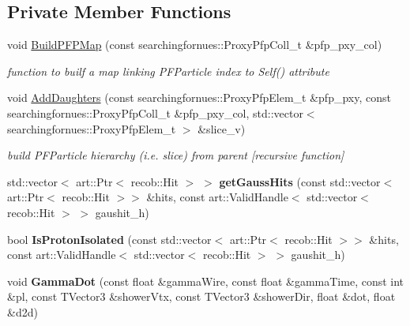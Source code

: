 \subsection*{Private Member Functions}
\begin{DoxyCompactItemize}
\item 
void \hyperlink{classSecondShowerPurity_a740e87a9a228f255bca15d2f04505aa9}{Build\+P\+F\+P\+Map} (const searchingfornues\+::\+Proxy\+Pfp\+Coll\+\_\+t \&pfp\+\_\+pxy\+\_\+col)
\begin{DoxyCompactList}\small\item\em function to builf a map linking P\+F\+Particle index to Self() attribute \end{DoxyCompactList}\item 
void \hyperlink{classSecondShowerPurity_a91a362195490bc158713e4ed84ed0fa2}{Add\+Daughters} (const searchingfornues\+::\+Proxy\+Pfp\+Elem\+\_\+t \&pfp\+\_\+pxy, const searchingfornues\+::\+Proxy\+Pfp\+Coll\+\_\+t \&pfp\+\_\+pxy\+\_\+col, std\+::vector$<$ searchingfornues\+::\+Proxy\+Pfp\+Elem\+\_\+t $>$ \&slice\+\_\+v)
\begin{DoxyCompactList}\small\item\em build P\+F\+Particle hierarchy (i.\+e. slice) from parent \mbox{[}recursive function\mbox{]} \end{DoxyCompactList}\item 
std\+::vector$<$ art\+::\+Ptr$<$ recob\+::\+Hit $>$ $>$ {\bfseries get\+Gauss\+Hits} (const std\+::vector$<$ art\+::\+Ptr$<$ recob\+::\+Hit $>$$>$ \&hits, const art\+::\+Valid\+Handle$<$ std\+::vector$<$ recob\+::\+Hit $>$ $>$ gaushit\+\_\+h)\hypertarget{classSecondShowerPurity_ad2c997fc6ccdea277c14cfcad5c83243}{}\label{classSecondShowerPurity_ad2c997fc6ccdea277c14cfcad5c83243}

\item 
bool {\bfseries Is\+Proton\+Isolated} (const std\+::vector$<$ art\+::\+Ptr$<$ recob\+::\+Hit $>$$>$ \&hits, const art\+::\+Valid\+Handle$<$ std\+::vector$<$ recob\+::\+Hit $>$ $>$ gaushit\+\_\+h)\hypertarget{classSecondShowerPurity_aca45d8671bf9d292eed1ed00a80329b1}{}\label{classSecondShowerPurity_aca45d8671bf9d292eed1ed00a80329b1}

\item 
void {\bfseries Gamma\+Dot} (const float \&gamma\+Wire, const float \&gamma\+Time, const int \&pl, const T\+Vector3 \&shower\+Vtx, const T\+Vector3 \&shower\+Dir, float \&dot, float \&d2d)\hypertarget{classSecondShowerPurity_ac3aa736b52623968b984814ac75d6510}{}\label{classSecondShowerPurity_ac3aa736b52623968b984814ac75d6510}

\end{DoxyCompactItemize}
